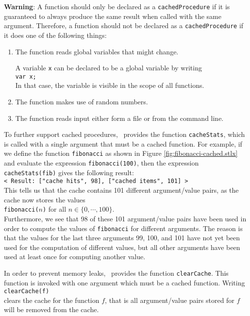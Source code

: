 \noindent
\textbf{Warning}:  A function should only be declared as a \texttt{cachedProcedure} if it is
guaranteed to always produce the same result when called with the same argument.
Therefore, a function should not be declared as a \texttt{cachedProcedure} if it does one
of the following things:
\begin{enumerate}
\item The function reads global variables that might change.

      A variable \texttt{x} can be declared to be a global variable by writing
      \\[0.2cm]
      \hspace*{1.3cm}
      \texttt{var x;}
      \\[0.2cm]
      In that case, the variable is visible in the scope of all functions.
\item The function makes use of random numbers.
\item The function reads input either form a file or from the command line.
\end{enumerate}
To further support cached procedures,  \setlx\ provides the function \texttt{cacheStats},
which is called with a single argument that must be a cached function.  For example, if
we define the function \texttt{fibonacci} as shown in Figure
\ref{fig:fibonacci-cached.stlx} and evaluate the expression \texttt{fibonacci(100)}, then
the expression \texttt{cacheStats(fib)} gives the following result:
\\[0.2cm]
\hspace*{1.3cm}
\texttt{< Result: {["cache hits", 98], ["cached items", 101]} >}
\\[0.2cm]
This tells us that the cache contains 101 different argument/value pairs, as the cache
now stores the values
\\[0.2cm]
\hspace*{1.3cm}
\texttt{fibonacci($n$)} \quad for all $n \in \{0,\cdots,100\}$.
\\[0.2cm]
Furthermore, we see that 98 of these 101 argument/value pairs have been used in order to
compute the values of \texttt{fibonacci} for different arguments.  The reason is that the
values for the last three arguments 99, 100, and 101 have not yet been used for the
computation of different values, but all other arguments have been used at least once for
computing another value.

In order to prevent memory leaks, \setlx\ provides the function \texttt{clearCache}.  This
function is invoked with one argument which must be a cached function.  Writing
\\[0.2cm]
\hspace*{1.3cm}
\texttt{clearCache(f)}
\\[0.2cm]
clears the cache for the function $f$, that is all argument/value pairs stored for $f$
will be removed from the cache.



